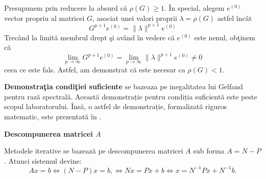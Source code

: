 \documentclass{exam}
\theoremstyle{definition}
\newtheorem{theorem}{Teoremă}
\newtheorem{remark}{Notă}
\newtheorem*{proofsketch}{Demonstrație}
\begin{document}
Presupunem prin reducere la absurd c\u{a} $\rho(G) \geq 1$. \^{I}n special, alegem $e^{(0)}$ vector propriu al matricei $G$, asociat unei valori proprii $\lambda=\rho(G)$ astfel \^{i}nc\^{a}t 
$$G^{p+1}e^{(0)} = \|\lambda\|^{p+1} e^{(0)}$$ 
Trec\^{a}nd la limit\u{a} membrul drept \c{s}i av\^{a}nd \^{i}n vedere c\u{a} $e^{(0)}$ este nenul, ob\c{t}inem c\u{a} 
$$\lim_{p\rightarrow \infty}G^{p+1}e^{(0)} = \lim_{p\rightarrow \infty}\|\lambda\|^{p+1} e^{(0)} \neq 0$$ ceea ce este fals. Astfel, am demonstrat c\u{a} este necesar ca $\rho(G) < 1$.

\textbf{Demonstra\c{t}ia condi\c{t}iei suficiente} se bazeaza pe inegalitatea lui Gelfand pentru raz\u{a} spectral\u{a}. Această demonstrație pentru condiția suficientă este peste scopul laboratorului. Însă, o astfel de demonstrație, formalizată riguros matematic, este prezentată în \cite{Hansen}.

\noindent\makebox[\linewidth]{\rule{\textwidth}{0.4pt}}




\vspace{10pt}

\par \textbf{Descompunerea matricei \(A\)}
\par  Metodele iterative se bazeaz\u{a} pe descompunerea matricei $A$ sub forma $A = N - P$. Atunci sistemul devine: $$Ax=b \iff (N - P)x = b, \iff Nx = Px + b\iff x = {N}^{-1}Px + {N}^{-1}b .$$
\end{document}
